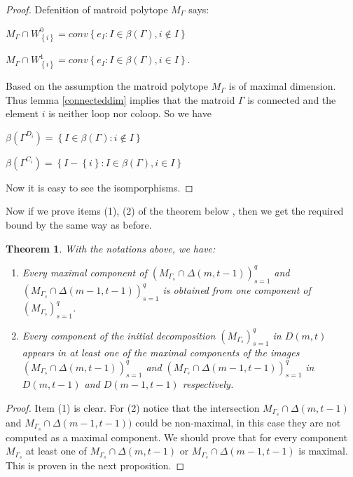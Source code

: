 \documentclass[12pt, reqno]{amsart}
\newtheorem{theorem}{Theorem}[section]
\theoremstyle{definition}
\theoremstyle{remark}
\numberwithin{equation}{section}
\begin{document}
\begin{proof}
	Defenition of matroid polytope 
	$M_{\Gamma}$
	says:
	\begin{center}
			$M_{\Gamma}\cap W^0_{\left\{i\right\}}=conv\left\{e_I:I\in \beta(\Gamma), i\notin I \right\}$
			
				$M_{\Gamma}\cap W^1_{\left\{i\right\}}=conv\left\{e_I:I\in \beta(\Gamma), i\in I \right\}.$
			
	\end{center}
	Based on the assumption the matroid polytope $M_{\Gamma}$ is of maximal dimension. Thus lemma \ref{connecteddim} implies that 
	the matroid
	$\Gamma$ is connected and the element $i$ is neither loop nor coloop. So we have
		\begin{center}
		$\beta(\Gamma^{D_i})=\left\{I\in \beta(\Gamma): i\notin I \right\}$
		
		$\beta(\Gamma^{C_i})=\left\{I-\left\{i\right\}:I\in \beta(\Gamma), i\in I \right\}$
		
	\end{center}
	 Now it is easy to see the isomporphisms.
\end{proof}
 Now if we prove
items (1), (2) of the theorem below , then we get the required bound by the same way as before.
 \begin{theorem}\label{main}
	With the notations above, we have:
	
	\begin{enumerate}
		\item 
		Every  maximal component of
		$(M_{\Gamma_s}\cap \Delta(m,t-1))^q_{s=1}$
		and
		$(M_{\Gamma_s}\cap \Delta(m-1,t-1))^q_{s=1}$
		 is obtained from one component of 
		$(M_{\Gamma_s})^q_{s=1}$.
		
		
		\item 
		Every   component of the 
		initial decomposition 
			$(M_{\Gamma_s})^q_{s=1}$
		in $D(m,t)$ appears in at least one of the maximal components of the images
			$(M_{\Gamma_s}\cap \Delta(m,t-1))^q_{s=1}$
		and
		$(M_{\Gamma_s}\cap \Delta(m-1,t-1))^q_{s=1}$
		in
		$D(m,t-1)$ and 
		$D(m-1,t-1)$ respectively.
	\end{enumerate}
\end{theorem}

\begin{proof}
	
	Item (1) is clear. For (2) notice that   the intersection 
	$M_{\Gamma_s}\cap \Delta(m,t-1)$
	and
	$M_{\Gamma_s}\cap \Delta(m-1,t-1))$
	could  be non-maximal, in this case they are not  computed as a maximal component. We should prove  that for every component 
	$M_{\Gamma_s}$ at least one of 
	$M_{\Gamma_s}\cap \Delta(m,t-1)$
	or
	$M_{\Gamma_s}\cap \Delta(m-1,t-1)$
	is maximal. This is proven in the next proposition.
	
	\end{proof}
  
\end{document}
